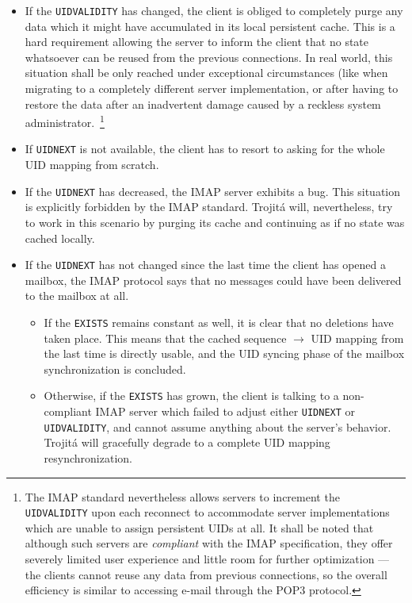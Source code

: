 \documentclass[trojita]{subfiles}
\begin{document}
\begin{itemize}
  \item If the {\tt UIDVALIDITY} has changed, the client is obliged to completely purge any data which it might have
    accumulated in its local persistent cache.  This is a hard requirement allowing the server to inform the client that
    no state whatsoever can be reused from the previous connections.  In real world, this situation shall be only
    reached under exceptional circumstances (like when migrating to a completely different server implementation, or
    after having to restore the data after an inadvertent damage caused by a reckless system
    administrator.~\footnote{The IMAP standard nevertheless allows servers to increment the {\tt UIDVALIDITY} upon each
    reconnect to accommodate server implementations which are unable to assign persistent UIDs at all.  It shall be
    noted that although such servers are {\em compliant} with the IMAP specification, they offer severely limited user
    experience and little room for further optimization --- the clients cannot reuse any data from previous connections,
    so the overall efficiency is similar to accessing e-mail through the POP3 protocol.}
  \item If {\tt UIDNEXT} is not available, the client has to resort to asking for the whole UID mapping from scratch.
  \item If the {\tt UIDNEXT} has decreased, the IMAP server exhibits a bug.  This situation is explicitly forbidden by
    the IMAP standard.  Trojitá will, nevertheless, try to work in this scenario by purging its cache and continuing as
    if no state was cached locally.
  \item If the {\tt UIDNEXT} has not changed since the last time the client has opened a mailbox, the IMAP protocol says
    that no messages could have been delivered to the mailbox at all.
    \begin{itemize}
      \item If the {\tt EXISTS} remains constant as well, it is clear that no deletions have taken place. This means
        that the cached sequence $\rightarrow$ UID mapping from the last time is directly usable, and the UID syncing
        phase of the mailbox synchronization is concluded.
      \item Otherwise, if the {\tt EXISTS} has grown, the client is talking to a non-compliant IMAP server which failed
        to adjust either {\tt UIDNEXT} or {\tt UIDVALIDITY}, and cannot assume anything about the server's behavior.
        Trojitá will gracefully degrade to a complete UID mapping resynchronization.

\end{itemize}
\end{itemize}
\end{document}
